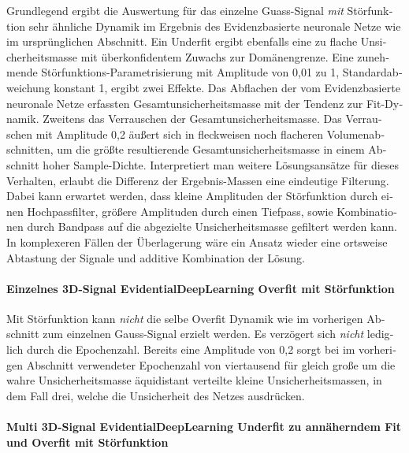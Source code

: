 \begin{otherlanguage}{ngerman}
Grundlegend ergibt die Auswertung für das einzelne Guass-Signal \textit{mit} Störfunktion sehr ähnliche Dynamik im Ergebnis des \gls{Evidenzbasierte neuronale Netze} wie im ursprünglichen Abschnitt. Ein Underfit ergibt ebenfalls eine zu flache Unsicherheitsmasse mit überkonfidentem Zuwachs zur Domänengrenze. Eine zunehmende Störfunktions-Parametrisierung mit Amplitude von 0,01 zu 1, Standardabweichung konstant 1, ergibt zwei Effekte. Das Abflachen der vom \gls{Evidenzbasierte neuronale Netze} erfassten Gesamtunsicherheitsmasse mit der Tendenz zur Fit-Dynamik. Zweitens das Verrauschen der Gesamtunsicherheitsmasse. Das Verrauschen mit Amplitude 0,2 äußert sich in fleckweisen noch flacheren Volumenabschnitten, um die größte resultierende Gesamtunsicherheitsmasse in einem Abschnitt hoher Sample-Dichte. Interpretiert man weitere Lösungsansätze für dieses Verhalten, erlaubt die Differenz der Ergebnis-Massen eine eindeutige Filterung. Dabei kann erwartet werden, dass kleine Amplituden der Störfunktion durch einen Hochpassfilter, größere Amplituden durch einen Tiefpass, sowie Kombinationen durch Bandpass auf die abgezielte Unsicherheitsmasse gefiltert werden kann. In komplexeren Fällen der Überlagerung wäre ein Ansatz wieder eine ortsweise Abtastung der Signale und additive Kombination der Lösung. 



\paragraph{Einzelnes 3D-Signal \gls{EvidentialDeepLearning} Overfit mit Störfunktion}

Mit Störfunktion kann \textit{nicht} die selbe Overfit Dynamik wie im vorherigen Abschnitt zum einzelnen Gauss-Signal erzielt werden. Es verzögert sich \textit{nicht} lediglich durch die Epochenzahl. Bereits eine Amplitude von 0,2 sorgt bei im vorherigen Abschnitt verwendeter Epochenzahl von viertausend für gleich große um die wahre Unsicherheitsmasse äquidistant verteilte kleine Unsicherheitsmassen, in dem Fall drei, welche die Unsicherheit des Netzes ausdrücken. 



\paragraph{Multi 3D-Signal \gls{EvidentialDeepLearning} Underfit zu annäherndem Fit und Overfit mit Störfunktion} 


\end{otherlanguage}
